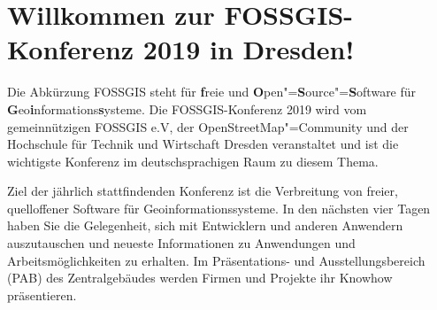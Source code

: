 \newpage
\section*{Willkommen zur FOSSGIS-Konferenz 2019 in Dresden!} \label{welcome}
Die Abkürzung { FOSSGIS} steht für {\bf f}reie und {\bf O}pen"={\bf S}ource"={\bf S}oftware für {\bf G}eo{\bf i}nformations{\bf s}ysteme.
Die FOSSGIS-Konferenz 2019 wird vom gemeinnützigen FOSSGIS e.V, der
OpenStreetMap"=Community und der Hochschule für Technik und Wirtschaft Dresden
veranstaltet und ist die wichtigste Konferenz im deutschsprachigen Raum zu
diesem Thema.

Ziel der jährlich stattfindenden Konferenz ist die Verbreitung von freier,
quelloffener Software für Geoinformationssysteme. In den nächsten vier Tagen
haben Sie die Gelegenheit, sich mit Entwicklern und anderen Anwendern
auszutauschen und \mbox{neueste} Informationen zu Anwendungen und
Arbeitsmöglichkeiten zu erhalten. Im Präsentations- und Ausstellungsbereich (PAB) des Zentralgebäudes werden Firmen
und Projekte ihr Knowhow präsentieren.

\newpage


